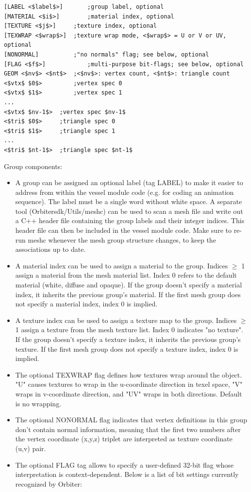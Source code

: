 \documentclass[Orbiter Developer Manual.tex]{subfiles}
\begin{document}
\begin{lstlisting}[language=OSFS,mathescape=true]
[LABEL <$label$>]		;group label, optional
[MATERIAL <$i$>]		;material index, optional
[TEXTURE <$j$>]		;texture index, optional
[TEXWRAP <$wrap$>]	;texture wrap mode, <$wrap$> = U or V or UV, optional
[NONORMAL]			;"no normals" flag; see below, optional
[FLAG <$f$>]			;multi-purpose bit-flags; see below, optional
GEOM <$nv$> <$nt$>	;<$nv$>: vertex count, <$nt$>: triangle count
<$vtx$ $0$>			;vertex spec 0
<$vtx$ $1$>			;vertex spec 1
...
<$vtx$ $nv-1$>	;vertex spec $nv-1$
<$tri$ $0$>		;triangle spec 0
<$tri$ $1$>		;triangle spec 1
...
<$tri$ $nt-1$>	;triangle spec $nt-1$
\end{lstlisting}

\noindent
Group components:

\begin{itemize}
\item A group can be assigned an optional label (tag LABEL) to make it easier to address from within the vessel module code (e.g. for coding an animation sequence). The label must be a single word without white space. A separate tool (Orbitersdk/Utils/meshc) can be used to scan a mesh file and write out a C++ header file containing the group labels and their integer indices. This header file can then be included in the vessel module code. Make sure to re-run meshc whenever the mesh group structure changes, to keep the associations up to date.
\item A material index can be used to assign a material to the group. Indices $\geq$ 1 assign a material from the mesh material list. Index 0 refers to the default material (white, diffuse and opaque). If the group doesn't specify a material index, it inherits the previous group's material. If the first mesh group does not specify a material index, index 0 is implied.
\item A texture index can be used to assign a texture map to the group. Indices $\geq$ 1 assign a texture from the mesh texture list. Index 0 indicates "no texture". If the group doesn't specify a texture index, it inherits the previous group's texture. If the first mesh group does not specify a texture index, index 0 is implied.
\item The optional TEXWRAP flag defines how textures wrap around the object. "U" causes textures to wrap in the u-coordinate direction in texel space, "V" wraps in v-coordinate direction, and "UV" wraps in both directions. Default is no wrapping.
\item The optional NONORMAL flag indicates that vertex definitions in this group don't contain normal information, meaning that the first two numbers after the vertex coordinate (x,y,z) triplet are interpreted as texture coordinate (u,v) pair.
\item The optional FLAG tag allows to specify a user-defined 32-bit flag whose interpretation is context-dependent. Below is a list of bit settings currently recognized by Orbiter:


\end{itemize}
\end{document}
